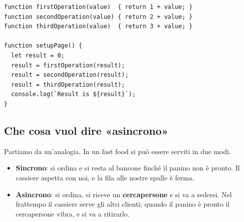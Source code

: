 \begin{affianco}[0.55][c]
\begin{lstlisting}[style=js, name=sincrono.js]
function firstOperation(value)  { return 1 + value; }
function secondOperation(value) { return 2 + value; }
function thirdOperation(value)  { return 3 + value; }

function setupPage() {
  let result = 0;
  result = firstOperation(result);
  result = secondOperation(result);
  result = thirdOperation(result);
  console.log(`Result is ${result}`);
}
\end{lstlisting}
\risultato
\begin{immagine}
\end{immagine}
\end{affianco}

\subsection{Che cosa vuol dire «asincrono»}

Partiamo da un'analogia. In un fast food si può essere serviti in due modi.

\begin{itemize}
  \item \textbf{Sincrono}: si ordina e si resta al bancone finché il panino non
        è pronto. Il cassiere aspetta con noi, e la fila alle nostre spalle è
        ferma.
  \item \textbf{Asincrono}: si ordina, si riceve un \textbf{cercapersone} e si
        va a sedersi. Nel frattempo il cassiere serve gli altri clienti; quando
        il panino è pronto il cercapersone vibra, e si va a ritirarlo.
\end{itemize}

